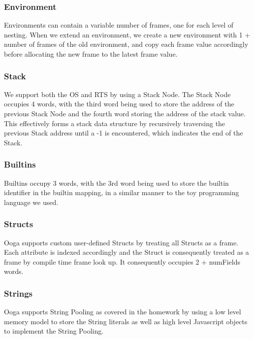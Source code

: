 \documentclass{report}
\begin{document}
\subsubsection{Environment} \label{section:env-node}

Environments can contain a variable number of frames, one for each level of nesting. When we extend an environment, we create a new environment with 1 + number of frames of the old environment, and copy each frame value accordingly before allocating the new frame to the latest frame value.

\subsubsection{Stack}\label{section:stack-node}

We support both the OS and RTS by using a Stack Node. The Stack Node occupies 4 words, with the third word being used to store the address of the previous Stack Node and the fourth word storing the address of the stack value. This effectively forms a stack data structure by recursively traversing the previous Stack address until a -1 is encountered, which indicates the end of the Stack.

\subsubsection{Builtins}

Builtins occupy 3 words, with the 3rd word being used to store the builtin identifier in the builtin mapping, in a similar manner to the toy programming language we used.

\subsubsection{Structs}

Ooga supports custom user-defined Structs by treating all Structs as a frame. Each attribute is indexed accordingly and the Struct is consequently treated as a frame by compile time frame look up. It consequently occupies 2 + numFields words.

\subsubsection{Strings}

Ooga supports String Pooling as covered in the homework by using a low level memory model to store the String literals as well as high level Javascript objects to implement the String Pooling.
\end{document}
